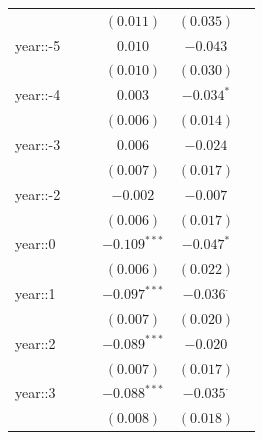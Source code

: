 \begin{table}
\begin{center}
\begin{tabular}{l c c c c c}
                             &                &                & $(0.011)$      & $(0.035)$        &                  \\
year::-5                     &                &                & $0.010$        & $-0.043$         &                  \\
                             &                &                & $(0.010)$      & $(0.030)$        &                  \\
year::-4                     &                &                & $0.003$        & $-0.034^{*}$     &                  \\
                             &                &                & $(0.006)$      & $(0.014)$        &                  \\
year::-3                     &                &                & $0.006$        & $-0.024$         &                  \\
                             &                &                & $(0.007)$      & $(0.017)$        &                  \\
year::-2                     &                &                & $-0.002$       & $-0.007$         &                  \\
                             &                &                & $(0.006)$      & $(0.017)$        &                  \\
year::0                      &                &                & $-0.109^{***}$ & $-0.047^{*}$     &                  \\
                             &                &                & $(0.006)$      & $(0.022)$        &                  \\
year::1                      &                &                & $-0.097^{***}$ & $-0.036^{\cdot}$ &                  \\
                             &                &                & $(0.007)$      & $(0.020)$        &                  \\
year::2                      &                &                & $-0.089^{***}$ & $-0.020$         &                  \\
                             &                &                & $(0.007)$      & $(0.017)$        &                  \\
year::3                      &                &                & $-0.088^{***}$ & $-0.035^{\cdot}$ &                  \\
                             &                &                & $(0.008)$      & $(0.018)$        &                  \\

\end{tabular}
\end{center}
\end{table}
